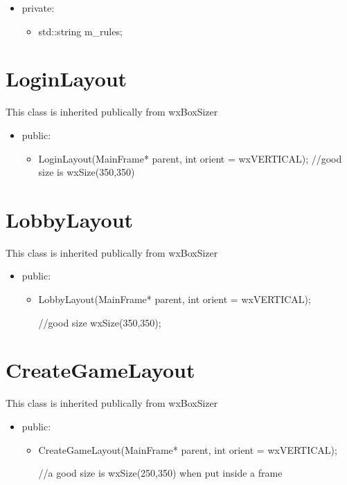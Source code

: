 \documentclass[]{scrartcl}
\begin{document}
	\begin{itemize}
		\item 	private:
		\begin{itemize}
			\item std::string m\_rules;
		\end{itemize}
	\end{itemize}

	
\section{LoginLayout }
	This class is inherited  publically from wxBoxSizer
	\begin{itemize}
		\item public:
		\begin{itemize}
			\item	LoginLayout(MainFrame* parent, int orient = wxVERTICAL);
				//good size is wxSize(350,350)
		\end{itemize}
	\end{itemize}



\section{LobbyLayout}
	This class is inherited  publically from wxBoxSizer
		\begin{itemize}
			\item public:
			\begin{itemize}
				\item	LobbyLayout(MainFrame* parent, int orient = wxVERTICAL);
				
				//good size wxSize(350,350);
			\end{itemize}
		\end{itemize}
		
\section{CreateGameLayout}
	This class is inherited  publically from wxBoxSizer
	
		\begin{itemize}
			\item public:
			\begin{itemize}
				\item	CreateGameLayout(MainFrame* parent, int orient = wxVERTICAL);
				
				//a good size is wxSize(250,350) when put inside a frame
			\end{itemize}
		\end{itemize}
\end{document}

